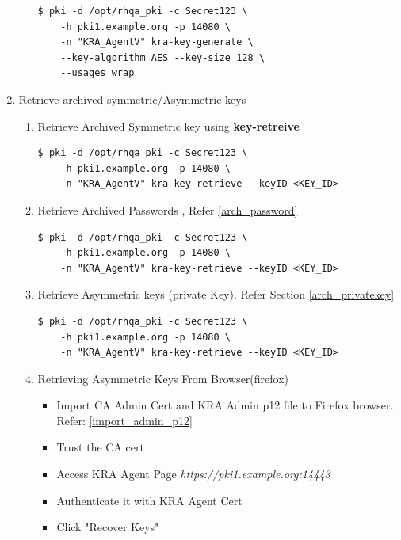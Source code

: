 \documentclass[a4paper]{article}
\begin{document}
\begin{enumerate}[label*=\arabic*.]
\begin{enumerate}[label*=\arabic*.]
                    \begin{lstlisting}[style=bashInputStyle]
$ pki -d /opt/rhqa_pki -c Secret123 \
    -h pki1.example.org -p 14080 \
    -n "KRA_AgentV" kra-key-generate \
    --key-algorithm AES --key-size 128 \
    --usages wrap 
                    \end{lstlisting}
            \end{enumerate}
        \item  Retrieve archived symmetric/Asymmetric keys 
            \begin{enumerate}[label*=\arabic*.]
                \item Retrieve Archived Symmetric key using \textbf{key-retreive}
                    \begin{lstlisting}[style=bashInputStyle]
$ pki -d /opt/rhqa_pki -c Secret123 \
    -h pki1.example.org -p 14080 \
    -n "KRA_AgentV" kra-key-retrieve --keyID <KEY_ID>
                    \end{lstlisting}
                \item Retrieve Archived Passwords , Refer \ref{arch_password}
                    \begin{lstlisting}[style=bashInputStyle]
$ pki -d /opt/rhqa_pki -c Secret123 \
    -h pki1.example.org -p 14080 \
    -n "KRA_AgentV" kra-key-retrieve --keyID <KEY_ID>
                    \end{lstlisting}
                \item Retrieve Asymmetric keys (private Key). Refer Section \ref{arch_privatekey}
                    \begin{lstlisting}[style=bashInputStyle]
$ pki -d /opt/rhqa_pki -c Secret123 \
    -h pki1.example.org -p 14080 \
    -n "KRA_AgentV" kra-key-retrieve --keyID <KEY_ID>
                    \end{lstlisting}
                \item Retrieving Asymmetric Keys From Browser(firefox)
                    \begin{itemize}
                        \item Import CA Admin Cert and KRA Admin p12 file to Firefox browser. Refer: \ref{import_admin_p12}
                        \item Trust the CA cert 
                        \item Access KRA Agent Page \textit{https://pki1.example.org:14443}
                        \item Authenticate it with KRA Agent Cert
                        \item Click "Recover Keys" 

\end{itemize}
\end{enumerate}
\end{enumerate}
\end{document}
